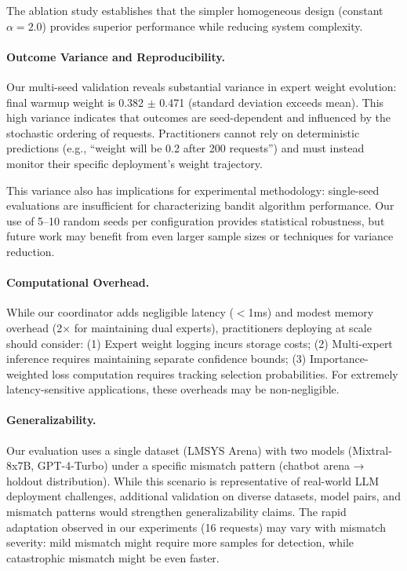 The ablation study establishes that the simpler homogeneous design (constant $\alpha=2.0$) provides superior performance while reducing system complexity.

\paragraph{Outcome Variance and Reproducibility.}
Our multi-seed validation reveals substantial variance in expert weight evolution: final warmup weight is 0.382 $\pm$ 0.471 (standard deviation exceeds mean).
This high variance indicates that outcomes are seed-dependent and influenced by the stochastic ordering of requests.
Practitioners cannot rely on deterministic predictions (e.g., ``weight will be 0.2 after 200 requests'') and must instead monitor their specific deployment's weight trajectory.

This variance also has implications for experimental methodology: single-seed evaluations are insufficient for characterizing bandit algorithm performance.
Our use of 5--10 random seeds per configuration provides statistical robustness, but future work may benefit from even larger sample sizes or techniques for variance reduction.

\paragraph{Computational Overhead.}
While our coordinator adds negligible latency ($<$1ms) and modest memory overhead (2× for maintaining dual experts), practitioners deploying at scale should consider:
(1) Expert weight logging incurs storage costs;
(2) Multi-expert inference requires maintaining separate confidence bounds;
(3) Importance-weighted loss computation requires tracking selection probabilities.
For extremely latency-sensitive applications, these overheads may be non-negligible.

\paragraph{Generalizability.}
Our evaluation uses a single dataset (LMSYS Arena) with two models (Mixtral-8x7B, GPT-4-Turbo) under a specific mismatch pattern (chatbot arena → holdout distribution).
While this scenario is representative of real-world LLM deployment challenges, additional validation on diverse datasets, model pairs, and mismatch patterns would strengthen generalizability claims.
The rapid adaptation observed in our experiments (16 requests) may vary with mismatch severity: mild mismatch might require more samples for detection, while catastrophic mismatch might be even faster.


